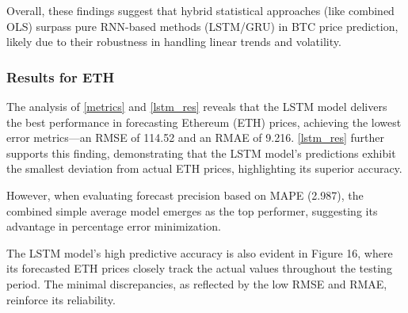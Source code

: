 \documentclass{dsfe}
\begin{document}
Overall, these findings suggest that hybrid statistical approaches (like combined OLS) surpass pure RNN-based methods (LSTM/GRU) in BTC price prediction, likely due to their robustness in handling linear trends and volatility.
\subsubsection{ Results for ETH}
The analysis of \autoref{metrics} and \autoref{lstm_res} reveals that the LSTM model delivers the best performance in forecasting Ethereum (ETH) prices, achieving the lowest error metrics—an RMSE of 114.52 and an RMAE of 9.216. \autoref{lstm_res} further supports this finding, demonstrating that the LSTM model’s predictions exhibit the smallest deviation from actual ETH prices, highlighting its superior accuracy.

However, when evaluating forecast precision based on MAPE (2.987), the combined simple average model emerges as the top performer, suggesting its advantage in percentage error minimization.

The LSTM model’s high predictive accuracy is also evident in Figure 16, where its forecasted ETH prices closely track the actual values throughout the testing period. The minimal discrepancies, as reflected by the low RMSE and RMAE, reinforce its reliability.
\end{document}
